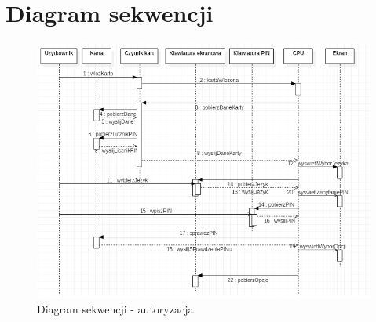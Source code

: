 \documentclass[a4paper, 11pt]{article}
\begin{document}
	\section{Diagram sekwencji}
	\indent
			
	\begin{figure}[H]%
			\includegraphics[scale=0.9]{sequence1.png}\caption{Diagram sekwencji - autoryzacja}
	\end{figure}
	
\end{document}
